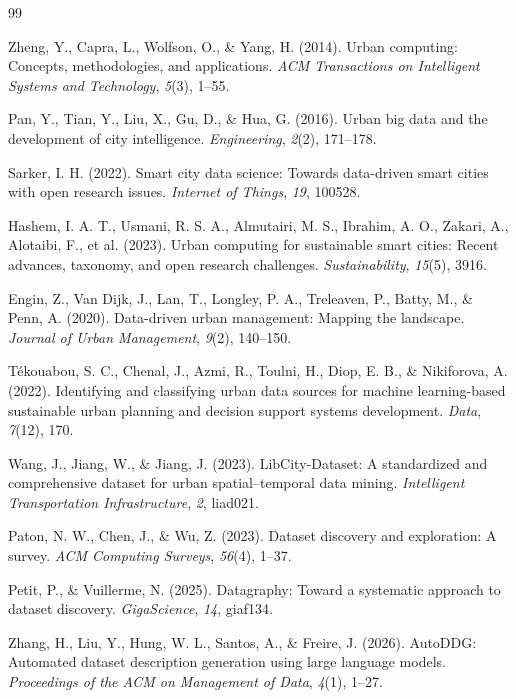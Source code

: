 \documentclass[a4paper,fleqn]{cas-sc}
\begin{document}
\begin{thebibliography}{99}

Zheng, Y., Capra, L., Wolfson, O., \& Yang, H. (2014).
Urban computing: Concepts, methodologies, and applications.
\textit{ACM Transactions on Intelligent Systems and Technology},
\textit{5}(3), 1--55.

Pan, Y., Tian, Y., Liu, X., Gu, D., \& Hua, G. (2016).
Urban big data and the development of city intelligence.
\textit{Engineering}, \textit{2}(2), 171--178.

Sarker, I. H. (2022).
Smart city data science: Towards data-driven smart cities with open research issues.
\textit{Internet of Things}, \textit{19}, 100528.

Hashem, I. A. T., Usmani, R. S. A., Almutairi, M. S.,
Ibrahim, A. O., Zakari, A., Alotaibi, F., et al. (2023).
Urban computing for sustainable smart cities: Recent advances,
taxonomy, and open research challenges.
\textit{Sustainability}, \textit{15}(5), 3916.

Engin, Z., Van Dijk, J., Lan, T., Longley, P. A.,
Treleaven, P., Batty, M., \& Penn, A. (2020).
Data-driven urban management: Mapping the landscape.
\textit{Journal of Urban Management}, \textit{9}(2), 140--150.

Tékouabou, S. C., Chenal, J., Azmi, R., Toulni, H.,
Diop, E. B., \& Nikiforova, A. (2022).
Identifying and classifying urban data sources for machine
learning-based sustainable urban planning and decision
support systems development.
\textit{Data}, \textit{7}(12), 170.

Wang, J., Jiang, W., \& Jiang, J. (2023).
LibCity-Dataset: A standardized and comprehensive dataset
for urban spatial--temporal data mining.
\textit{Intelligent Transportation Infrastructure},
\textit{2}, liad021.

Paton, N. W., Chen, J., \& Wu, Z. (2023).
Dataset discovery and exploration: A survey.
\textit{ACM Computing Surveys}, \textit{56}(4), 1--37.

Petit, P., \& Vuillerme, N. (2025).
Datagraphy: Toward a systematic approach to dataset discovery.
\textit{GigaScience}, \textit{14}, giaf134.

Zhang, H., Liu, Y., Hung, W. L., Santos, A., \& Freire, J. (2026).
AutoDDG: Automated dataset description generation using large language models.
\textit{Proceedings of the ACM on Management of Data},
\textit{4}(1), 1--27.


\end{thebibliography}
\end{document}
